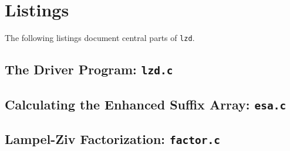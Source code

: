 \documentclass{article}
\newcommand{\ty}{\texttt}
\begin{document}
\section{Listings}
The following listings document central parts of \ty{lzd}.
\lstset{language=c}
\subsection{The Driver Program: \ty{lzd.c}}

\subsection{Calculating the Enhanced Suffix Array: \ty{esa.c}}

\subsection{Lampel-Ziv Factorization: \ty{factor.c}}


\end{document}
